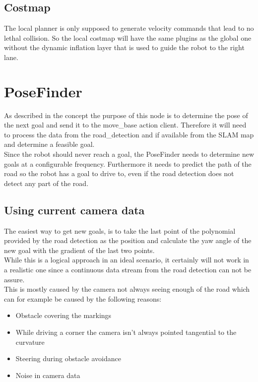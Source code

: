 \subsection{Costmap}
The local planner is only supposed to generate velocity commands that lead to no lethal collision. So the local costmap will have the same plugins as the global one without the dynamic inflation layer that is used to guide the robot to the right lane.


\section{PoseFinder}
As described in the concept the purpose of this node is to determine the pose of the next goal and send it to the move\_base action client. Therefore it will need to process the data from the road\_detection and if available from the SLAM map and determine a feasible goal.\\
Since the robot should never reach a goal, the PoseFinder needs to determine new goals at a configurable frequency. Furthermore it needs to predict the path of the road so the robot has a goal to drive to, even if the road detection does not detect any part of the road.



\subsection{Using current camera data}
The easiest way to get new goals, is to take the last point of the polynomial provided by the road detection as the position and calculate the yaw angle of the new goal with the gradient of the last two points.\\

While this is a logical approach in an ideal scenario, it certainly will not work in a realistic one since a continuous data stream from the road detection can not be assure.\\

This is mostly caused by the camera not always seeing enough of the road which can for example be caused by the following reasons:

\begin{itemize}
	\item Obstacle covering the markings
	\item While driving a corner the camera isn't always pointed tangential to the curvature
	\item Steering during obstacle avoidance
	\item Noise in camera data
\end{itemize}


